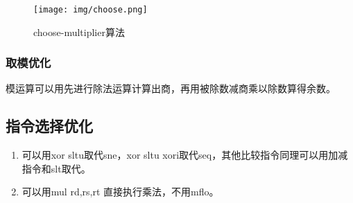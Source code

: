 \begin{figure}[H]
	\centering
	\texttt{[image: img/choose.png]}
	\caption{choose-multiplier算法}
	\label{fig:choose}
\end{figure}

\subsubsection{取模优化}
模运算可以用先进行除法运算计算出商，再用被除数减商乘以除数算得余数。

\subsection{指令选择优化}

\begin{enumerate}
    \item 可以用xor sltu取代sne，xor sltu xori取代seq，其他比较指令同理可以用加减指令和slt取代。
    \item 可以用mul rd,rs,rt 直接执行乘法，不用mflo。
\end{enumerate}